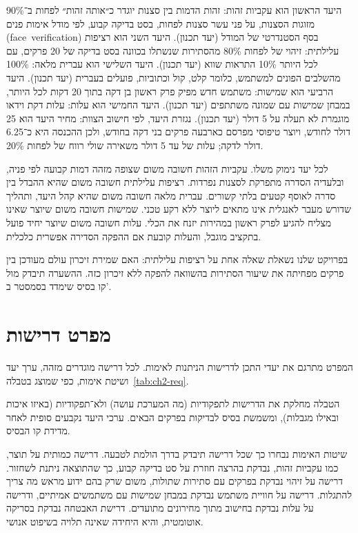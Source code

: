 היעד הראשון הוא עקביות זהות: זהות הדמות בין סצנות יוגדר כ״אותה זהות״ לפחות ב־90\% מזוגות הסצנות, על פני עשר סצנות לפחות, בסט בדיקה קבוע, לפי מודל אימות פנים (\mbox{\textenglish{face verification}}) בסף הסטנדרטי של המודל (יעד תכנון). היעד השני הוא רציפות עלילתית: זיהוי של לפחות 80\% מהסתירות שנשתלו בכוונה בסט בדיקה של 20 פרקים, עם לכל היותר 10\% התראות שווא (יעד תכנון). היעד השלישי הוא עברית מלאה: 100\% מהשלבים הפונים למשתמש, כלומר קלט, קול וכתוביות, פועלים בעברית (יעד תכנון). היעד הרביעי הוא שמישות: משתמש חדש מפיק פרק ראשון בן דקה בתוך 20 דקות לכל היותר, במבחן שמישות עם שמונה משתתפים (יעד תכנון). היעד החמישי הוא עלות: עלות דקת וידאו מוגמרת לא תעלה על 5 דולר (יעד תכנון). נגזרת היעד, לפי חישוב הצוות: מחיר היעד הוא 25 דולר לחודש, ויוצר טיפוסי מפרסם כארבעה פרקים בני דקה בחודש, ולכן ההכנסה היא כ־6.25 דולר לדקה; עלות של עד 5 דולר משאירה שולי רווח של לפחות 20\%.

לכל יעד נימוק משלו. עקביות הזהות חשובה משום שצופה מזהה דמות קבועה לפי פניה, ובלעדיה הסדרה מתפרקת לסצנות נפרדות. רציפות עלילתית חשובה משום שהיא ההבדל בין סדרה לאוסף קטעים בלתי קשורים. עברית מלאה חשובה משום שהיא קהל היעד, ותהליך שדורש מעבר לאנגלית אינו מתאים ליוצר ללא רקע טכני. שמישות חשובה משום שיוצר שאינו מצליח להגיע לפרק ראשון במהירות יזנח את הכלי. עלות חשובה משום שיוצר יחיד פועל בתקציב מוגבל, והעלות קובעת אם ההפקה הסדירה אפשרית כלכלית.

\begin{directornote}
  בפרויקט שלנו נשאלת שאלה אחת על רציפות עלילתית: האם שמירת זיכרון עולם מעודכן בין פרקים מפחיתה את שיעור הסתירות בהשוואה להפקה ללא זיכרון כזה. ההשערה תיבדק מול קו בסיס שימדד בסמסטר ב'.
\end{directornote}

\section{מפרט דרישות}
המפרט מתרגם את יעדי התכן לדרישות הניתנות לאימות. לכל דרישה מוגדרים מזהה, ערך יעד ושיטת אימות, כפי שמוצג בטבלה~\ref{tab:ch2-req}.

הטבלה מחלקת את הדרישות לתפקודיות (מה המערכת עושה) ולא־תפקודיות (באיזו איכות ובאילו מגבלות), ומשמשת בסיס לבדיקות בפרקים הבאים. ערכי היעד נקבעים סופית לאחר מדידת קו הבסיס.

שיטות האימות נבחרו כך שכל דרישה תיבדק בדרך הולמת לטבעה. דרישה כמותית על תוצר, כמו עקביות זהות, נבדקת בהרצה חוזרת על סט בדיקה קבוע, כך שהתוצאה ניתנת לשחזור. דרישה על זיהוי נבדקת בפרקים עם סתירות שתולות, משום שרק בהם ידוע מראש מה צריך להתגלות. דרישה על חוויית משתמש נבדקת במבחן שמישות עם משתמשים אמיתיים, ודרישה על עלות נבדקת בחישוב מתוך מחירונים מתועדים. דרישת האבטחה נבדקת בסריקה אוטומטית, והיא היחידה שאינה תלויה בשיפוט אנושי.

